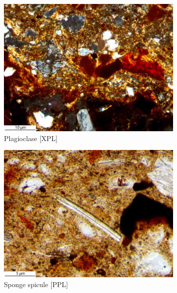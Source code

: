 \documentclass[a4paper]{article}
\begin{document}
\begin{figure}[H]
\begin{subfigure}[t]{.32\textwidth}
		\includegraphics[width=\textwidth]{ThinSections/11-6_20x_XPL.jpg}
		\caption{Plagioclase [XPL]}
	\end{subfigure}\hspace{.1em}\hfill
	\begin{subfigure}[t]{.32\textwidth}
		\includegraphics[width=\textwidth]{ThinSections/11-5_40x_PPL.jpg}
		\caption{Sponge spicule [PPL]}
	\end{subfigure}\hspace{.1em}\hfill
	\begin{subfigure}[t]{.32\textwidth}

\end{subfigure}
\end{figure}
\end{document}
